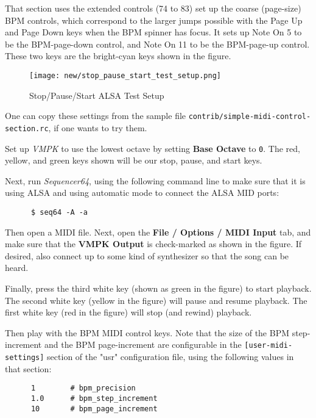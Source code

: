    That section uses the extended controls (74 to 83) set up the coarse
   (page-size) BPM controls, which correspond to the larger jumps possible with
   the Page Up and Page Down keys when the BPM spinner has focus.  It sets up
   Note On 5 to be the BPM-page-down control, and Note On 11 to be the
   BPM-page-up control.  These two keys are
   the bright-cyan keys shown in the figure.

\begin{figure}[H]
   \centering 
   \texttt{[image: new/stop\_pause\_start\_test\_setup.png]}
   \caption{Stop/Pause/Start ALSA Test Setup}
   \label{fig:rc_file_stop_pause_start_alsa_test_setup}
\end{figure}

   One can copy these settings from the sample file
   \texttt{contrib/simple-midi-control-section.rc}, if one wants to
   try them.

   Set up \textsl{VMPK} to use the lowest octave by setting
   \textbf{Base Octave} to \texttt{0}.  The red, yellow, and green
   keys shown will be our stop, pause, and start keys.

   Next, run \textsl{Sequencer64}, using the following command line to make
   sure that it is using ALSA and using automatic mode to connect the ALSA MID
   ports:

   \begin{verbatim}
      $ seq64 -A -a
   \end{verbatim}
   
   Then open a MIDI file.  Next,
   open the \textbf{File / Options / MIDI Input} tab, and make sure that
   the \textbf{VMPK Output} is check-marked as shown in the figure.
   If desired, also connect up to some kind of synthesizer so that the song can
   be heard.

   Finally, press the third white key (shown as green in the figure) to start
   playback.  The second white key (yellow in the figure) will pause and resume
   playback.  The first white key (red in the figure) will stop (and rewind)
   playback.

   Then play with the BPM MIDI control keys.  Note that the size of the
   BPM step-increment and the BPM page-increment are configurable in the
   \texttt{[user-midi-settings]} section of the "usr" configuration file,
   using the following values in that section:

   \begin{verbatim}
      1        # bpm_precision
      1.0      # bpm_step_increment
      10       # bpm_page_increment
   \end{verbatim}

